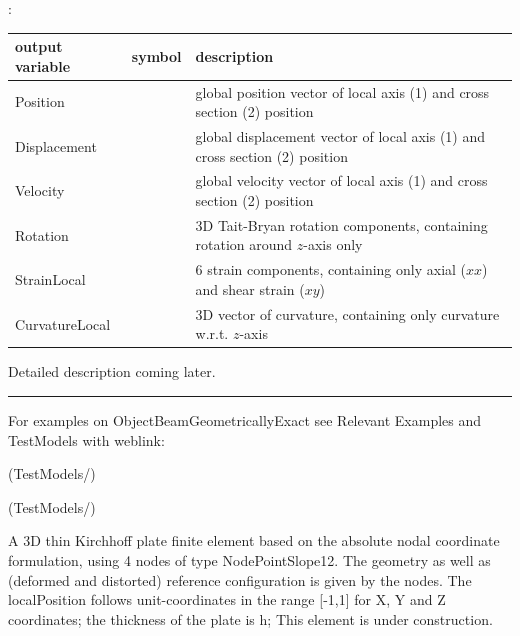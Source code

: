:
\begin{center}
\footnotesize
\begin{longtable}{| p{5cm} | p{5cm} | p{6cm} |} 
\hline
\bf output variable & \bf symbol & \bf description \\ \hline
Position &  & global position vector of local axis (1) and cross section (2) position\\ \hline
Displacement &  & global displacement vector of local axis (1) and cross section (2) position\\ \hline
Velocity &  & global velocity vector of local axis (1) and cross section (2) position\\ \hline
Rotation &  & 3D Tait-Bryan rotation components, containing rotation around $z$-axis only\\ \hline
StrainLocal &  & 6 strain components, containing only axial ($xx$) and shear strain ($xy$)\\ \hline
CurvatureLocal &  & 3D vector of curvature, containing only curvature w.r.t. $z$-axis\\ \hline
\end{longtable}
\end{center}
 \noindent
    Detailed description coming later.
\vspace{6pt}\par\noindent\rule{\textwidth}{0.4pt}
%
\noindent For examples on ObjectBeamGeometricallyExact see Relevant Examples and TestModels with weblink:
\bi
\item {} (TestModels/)
\item {} (TestModels/)

\ei

%
\newpage


\label{sec:item:ObjectANCFThinPlate}
A 3D thin Kirchhoff plate finite element based on the absolute nodal coordinate formulation, using 4 nodes of type NodePointSlope12. The geometry as well as (deformed and distorted) reference configuration is given by the nodes. The localPosition follows unit-coordinates in the range [-1,1] for X, Y and Z coordinates; the thickness of the plate is h; This element is under construction.
\vspace{12pt}\\

